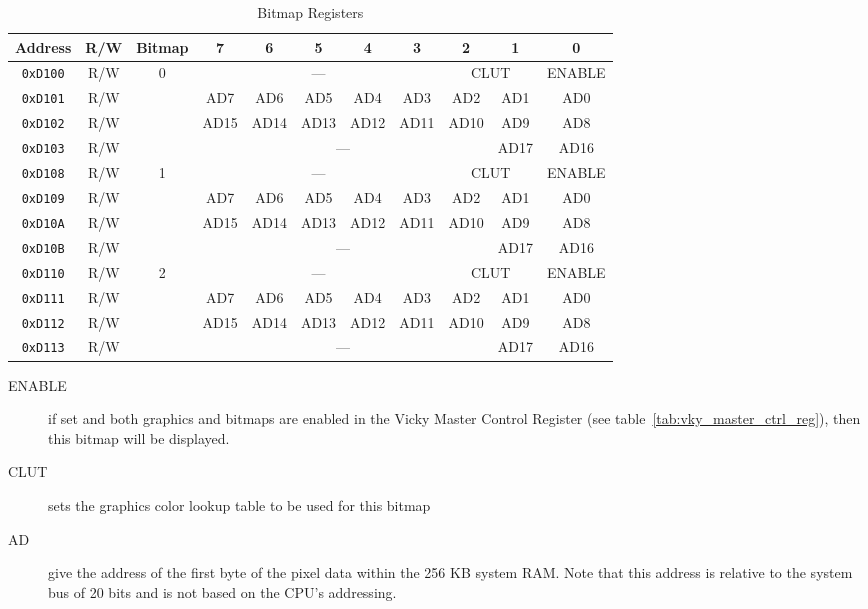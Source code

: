 \begin{table}[ht]
    \begin{center}
        \begin{tabular}{|c|c|c|c|c|c|c|c|c|c|c|} \hline
            Address & R/W & Bitmap & 7 & 6 & 5 & 4 & 3 & 2 & 1 & 0 \\ \hline\hline
            \verb+0xD100+ & R/W & \multirow{4}{*}{0} & \multicolumn{5}{|c|}{---} & \multicolumn{2}{|c|}{CLUT} & ENABLE \\\cline{1-2}\cline{4-11}
            \verb+0xD101+ & R/W & & AD7 & AD6 & AD5 & AD4 & AD3 & AD2 & AD1 & AD0 \\\cline{1-2}\cline{4-11}
            \verb+0xD102+ & R/W & & AD15 & AD14 & AD13 & AD12 & AD11 & AD10 & AD9 & AD8 \\\cline{1-2}\cline{4-11}
            \verb+0xD103+ & R/W & & \multicolumn{6}{|c|}{---} & AD17 & AD16 \\ \hline

            \verb+0xD108+ & R/W & \multirow{4}{*}{1} & \multicolumn{5}{|c|}{---} & \multicolumn{2}{|c|}{CLUT} & ENABLE \\\cline{1-2}\cline{4-11}
            \verb+0xD109+ & R/W & & AD7 & AD6 & AD5 & AD4 & AD3 & AD2 & AD1 & AD0 \\\cline{1-2}\cline{4-11}
            \verb+0xD10A+ & R/W & & AD15 & AD14 & AD13 & AD12 & AD11 & AD10 & AD9 & AD8 \\\cline{1-2}\cline{4-11}
            \verb+0xD10B+ & R/W & & \multicolumn{6}{|c|}{---} & AD17 & AD16 \\ \hline

            \verb+0xD110+ & R/W & \multirow{4}{*}{2} & \multicolumn{5}{|c|}{---} & \multicolumn{2}{|c|}{CLUT} & ENABLE \\\cline{1-2}\cline{4-11}
            \verb+0xD111+ & R/W & & AD7 & AD6 & AD5 & AD4 & AD3 & AD2 & AD1 & AD0 \\\cline{1-2}\cline{4-11}
            \verb+0xD112+ & R/W & & AD15 & AD14 & AD13 & AD12 & AD11 & AD10 & AD9 & AD8 \\\cline{1-2}\cline{4-11}
            \verb+0xD113+ & R/W & & \multicolumn{6}{|c|}{---} & AD17 & AD16 \\ \hline
        \end{tabular}
    \end{center}
    \caption{Bitmap Registers}
    \label{tab:bm_registers}
\end{table}

\begin{description}
    \item[ENABLE] if set and both graphics and bitmaps are enabled in the Vicky Master Control Register (see table~\ref{tab:vky_master_ctrl_reg}), then this bitmap will be displayed.

    \item[CLUT] sets the graphics color lookup table to be used for this bitmap

    \item[AD] give the address of the first byte of the pixel data within the 256 KB system RAM. Note that this address is relative to the system bus of 20 bits and is not based on the CPU's addressing.
\end{description}

